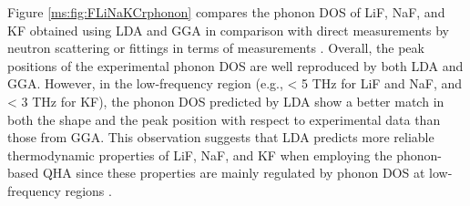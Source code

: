 Figure \ref{ms:fig:FLiNaKCrphonon} compares the phonon DOS of LiF, NaF, and KF obtained using LDA and GGA in comparison with direct measurements by neutron scattering \cite{dolling1968lattice, buhrer1970lattice} or fittings in terms of measurements \cite{karo1969lattice}. Overall, the peak positions of the experimental phonon DOS are well reproduced by both LDA and GGA. However, in the low-frequency region (e.g., < 5 THz for LiF and NaF, and < 3 THz for KF), the phonon DOS predicted by LDA show a better match in both the shape and the peak position with respect to experimental data \cite{dolling1968lattice, buhrer1970lattice, karo1969lattice} than those from GGA. This observation suggests that LDA predicts more reliable thermodynamic properties of LiF, NaF, and KF when employing the phonon-based QHA since these properties are mainly regulated by phonon DOS at low-frequency regions \cite{shang2019achieving}. 

